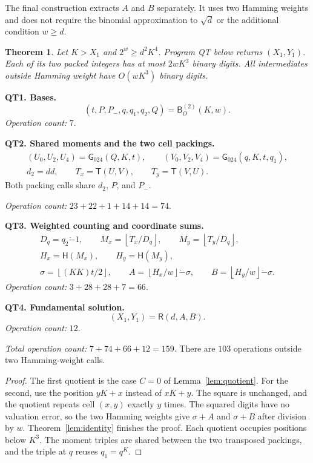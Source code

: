\documentclass[11pt]{article}
\newtheorem{theorem}{Theorem}
\theoremstyle{remark}
\newcommand{\tsub}{\mathbin{\dot{-}}}
\newcommand{\fl}[1]{\left\lfloor #1\right\rfloor}
\newcommand{\Gtriple}{\mathsf{G}_{024}}
\newcommand{\Recover}{\mathsf{R}}
\newcommand{\Squared}{\mathsf{T}}
\begin{document}
The final construction extracts $A$ and $B$ separately. It uses two
Hamming weights and does not require the binomial approximation to
$\sqrt d$ or the additional condition $w\ge d$.

\begin{theorem}\label{thm:qt}
Let $K>X_1$ and $2^w\ge d^2K^4$.
Program QT below returns $(X_1,Y_1)$.
Each of its two packed integers has at most $2wK^3$ binary digits.
All intermediates outside Hamming weight have $O(wK^3)$ binary digits.
\end{theorem}

\textbf{QT1. Bases.}
\[
  (t,P,P_-,q,q_1,q_2,Q)=\mathsf B_O^{(2)}(K,w).
\]
\emph{Operation count:} $7$.

\textbf{QT2. Shared moments and the two cell packings.}
\begin{gather*}
  (U_0,U_2,U_4)=\Gtriple(Q,K,t),\qquad
  (V_0,V_2,V_4)=\Gtriple(q,K,t,q_1),\\
  d_2=dd,\qquad T_x=\Squared(U,V),\qquad T_y=\Squared(V,U).
\end{gather*}
Both packing calls share $d_2$, $P$, and $P_-$.

\emph{Operation count:} $23+22+1+14+14=74$.

\textbf{QT3. Weighted counting and coordinate sums.}
\begin{gather*}
  D_q=q_2\tsub1,\qquad M_x=\fl{T_x/D_q},\qquad M_y=\fl{T_y/D_q},\\
  H_x=\mathsf H(M_x),\qquad H_y=\mathsf H(M_y),\\
  \sigma=\fl{(KK)t/2},\qquad
  A=\fl{H_x/w}\tsub\sigma,\qquad B=\fl{H_y/w}\tsub\sigma.
\end{gather*}
\emph{Operation count:} $3+28+28+7=66$.

\textbf{QT4. Fundamental solution.}
\[
  (X_1,Y_1)=\Recover(d,A,B).
\]
\emph{Operation count:} $12$.

\emph{Total operation count:} $7+74+66+12=159$.
There are $103$ operations outside two Hamming-weight calls.

\begin{proof}
The first quotient is the case $C=0$ of Lemma~\ref{lem:quotient}.
For the second, use the position $yK+x$ instead of $xK+y$.
The square is unchanged, and the quotient repeats cell $(x,y)$
exactly $y$ times. The squared digits have no valuation error,
so the two Hamming weights give $\sigma+A$ and $\sigma+B$ after
division by $w$. Theorem~\ref{lem:identity} finishes the proof.
Each quotient occupies positions below $K^3$. The moment triples
are shared between the two transposed packings, and the triple at
$q$ reuses $q_1=q^K$.
\end{proof}
\end{document}
